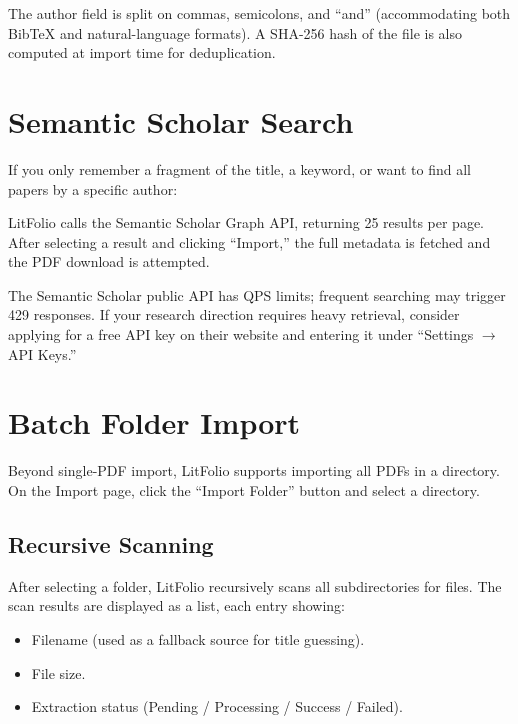 The author field is split on commas, semicolons, and ``and'' (accommodating both
BibTeX and natural-language formats). A SHA-256 hash of the file is also computed
at import time for deduplication.

\section{Semantic Scholar Search}

If you only remember a fragment of the title, a keyword, or want to find all papers
by a specific author:


LitFolio calls the Semantic Scholar Graph API, returning 25 results per page. After
selecting a result and clicking ``Import,'' the full metadata is fetched and the PDF
download is attempted.

\begin{warnbox}
The Semantic Scholar public API has QPS limits; frequent searching may trigger 429
responses. If your research direction requires heavy retrieval, consider applying for
a free API key on their website and entering it under ``Settings $\to$ API Keys.''
\end{warnbox}

\section{Batch Folder Import}

Beyond single-PDF import, LitFolio supports importing all PDFs in a directory. On the
Import page, click the ``Import Folder'' button and select a directory.

\subsection{Recursive Scanning}

After selecting a folder, LitFolio recursively scans all subdirectories for 
files. The scan results are displayed as a list, each entry showing:

\begin{itemize}
  \item Filename (used as a fallback source for title guessing).
  \item File size.
  \item Extraction status (Pending / Processing / Success / Failed).
\end{itemize}

